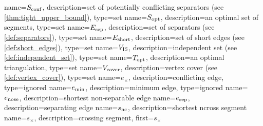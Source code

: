 {
  name={\ensuremath{S_\textnormal{conf}}},
  description={set of potentially conflicting separators (see \cref{thm:tight_upper_bound})},
  type={set}
}
{
  name={\ensuremath{S_\textnormal{opt}}},
  description={an optimal set of segments},
  type={set}
}
{
  name={\ensuremath{E_\textnormal{sep}}},
  description={set of separators (see \cref{def:separators})},
  type={set}
}
{
  name={\ensuremath{E_\textnormal{short}}},
  description={set of short edges (see \cref{def:short_edges})},
  type={set}
}
{
  name={\ensuremath{V_\textnormal{IS}}},
  description={independent set (see \cref{def:independent_set})},
  type={set}
}
{
  name={\ensuremath{T_\textnormal{opt}}},
  description={an optimal triangulation},
  type={set}
}
{
  name={\ensuremath{V_\textnormal{cover}}},
  description={vertex cover (see \cref{def:vertex_cover})},
  type={set}
}
{
  name={\ensuremath{e_{\times}}},
  description={conflicting edge},
  type={ignored}
}
{
  name={\ensuremath{e_\textnormal{min}}},
  description={minimum edge},
  type={ignored}
}
{
  name={\ensuremath{e_\textnormal{nose}}},
  description={shortest non-separable edge}
}
{
  name={\ensuremath{e_\textnormal{sep}}},
  description={separating edge}
}
{
  name={\ensuremath{s_\textnormal{nc}}},
  description={shortest \gls{ncross} segment}
}
{
  name={\ensuremath{s_{\times}}},
  description={crossing segment},
  first={\ensuremath{s_{\times}}}
}
